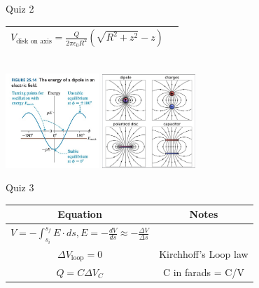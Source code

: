 \documentclass{article}
\begin{document}
\begin{center}
\begin{section}{Quiz 2}
\begin{tabular}{|c|c|}
		 $V_\text{disk on axis} = \frac{Q}{2 \pi \epsilon_0 R^2} \left( \sqrt{R^2 + z^2} - z \right)$ &                                                                            \\



		 \hline
	 \end{tabular}
	 \\
	 \includegraphics[width=100pt]{final_cheet_sheet_resources/gxmdaouxejjbmynkdouerjsizepbpzqv.jpg}
	 \includegraphics[width=100pt]{final_cheet_sheet_resources/wsqwwfonwjqrkuiumpdthpngngyqovlq.jpg}

	\end{section}

	\begin{section}{Quiz 3}
	 \begin{tabular}{|c|c|}
		 \hline
		 Equation                                                                       & Notes                                                                       \\
		 \hline

		 $V = - \int_{s_i}^{s_f} E \cdot ds, E
		 = - \frac{dV}{ds} \approx - \frac{\Delta V}{\Delta s}   $                      &                                                                             \\

		 $\Delta V_\text{loop} = 0 $                                                    & Kirchhoff's Loop law                                                        \\

		 $Q = C \Delta V_C$                                                             & C in farads = C/V                                                           \\


\end{tabular}
\end{section}
\end{center}
\end{document}
